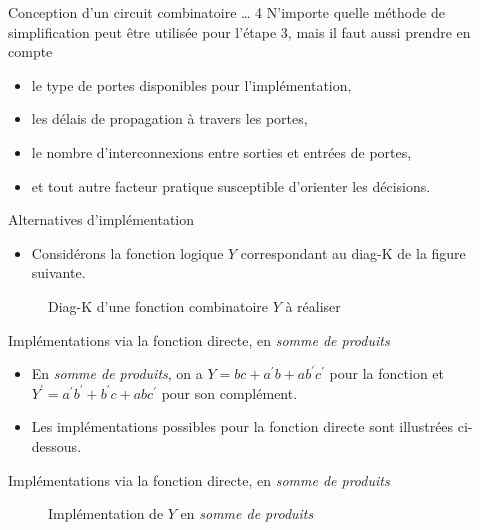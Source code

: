 \documentclass[presentation]{beamer}
\begin{document}
\begin{frame}[label={sec:org663a2a5}]{Conception d'un circuit combinatoire \ldots{} 4}
N'importe quelle méthode de simplification peut être utilisée pour l'étape 3, mais il faut aussi prendre en compte 
\begin{itemize}
\item le type de portes disponibles pour l'implémentation,
\item les délais de propagation à travers les portes,
\item le nombre d'interconnexions entre sorties et entrées de portes,
\item et tout autre facteur pratique susceptible d'orienter les décisions.
\end{itemize}
\end{frame}

\begin{frame}[label={sec:org5b593f1}]{Alternatives d'implémentation}
\begin{itemize}
\item Considérons la fonction logique \(Y\) correspondant au diag-K de la figure suivante.
\end{itemize}

\begin{figure}[htbp]
\centering

\caption{\label{fig:org0f064b7}Diag-K d'une fonction combinatoire \(Y\) à réaliser}
\end{figure} 
\end{frame}

\begin{frame}[label={sec:org5636628}]{Implémentations via la fonction directe, en \emph{somme de produits}}
\begin{itemize}
\item En \emph{somme de produits}, on a \(Y = bc + a^\prime b + a b^\prime c^\prime\) pour la fonction et \(Y^\prime = a^\prime b^\prime + b^\prime c + a b c^\prime\) pour son complément.

\item Les implémentations possibles pour la fonction directe sont illustrées ci-dessous.
\end{itemize}
\end{frame}

\begin{frame}[label={sec:orgb4799c0}]{Implémentations via la fonction directe, en \emph{somme de produits}}
\begin{figure}[htbp]
\centering

\caption{\label{fig:org6b617a8}Implémentation de \(Y\) en \emph{somme de produits}}
\end{figure} 
\end{frame}
\end{document}
